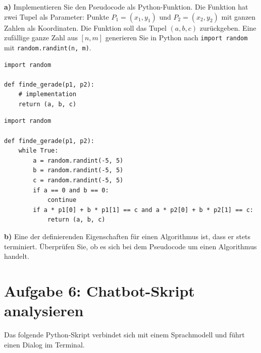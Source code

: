 \noindent \textbf{a)} Implementieren Sie den Pseudocode als Python-Funktion. Die Funktion hat zwei Tupel als Parameter: Punkte $P_1 = (x_1, y_1)$ und $P_2 = (x_2, y_2)$ mit ganzen Zahlen als Koordinaten. Die Funktion soll das Tupel $(a,b,c)$ zurückgeben. Eine zufällige ganze Zahl aus $[n, m]$ generieren Sie in Python nach \texttt{import random} mit \texttt{random.randint(n, m)}.

\begin{lstlisting}[style=python]
import random

def finde_gerade(p1, p2):
    # implementation
    return (a, b, c)
\end{lstlisting}

\ifdefined\zeigloesungen
\begin{tcolorbox}[
    colback=loesungbg, colframe=loesungframe,
    fonttitle=\bfseries\small, title=L{\"o}sung,
    left=4pt, right=4pt, top=2pt, bottom=2pt,
    before skip=4pt, after skip=4pt
]
\begin{lstlisting}[style=python]
import random

def finde_gerade(p1, p2):
    while True:
        a = random.randint(-5, 5)
        b = random.randint(-5, 5)
        c = random.randint(-5, 5)
        if a == 0 and b == 0:
            continue
        if a * p1[0] + b * p1[1] == c and a * p2[0] + b * p2[1] == c:
            return (a, b, c)
\end{lstlisting}
\end{tcolorbox}
\fi
\medskip

\noindent \textbf{b)} Eine der definierenden Eigenschaften für einen Algorithmus ist, dass er stets terminiert. Überprüfen Sie, ob es sich bei dem Pseudocode um einen Algorithmus handelt.


\section*{Aufgabe 6: Chatbot-Skript analysieren}

\noindent Das folgende Python-Skript verbindet sich mit einem Sprachmodell und
führt einen Dialog im Terminal.

